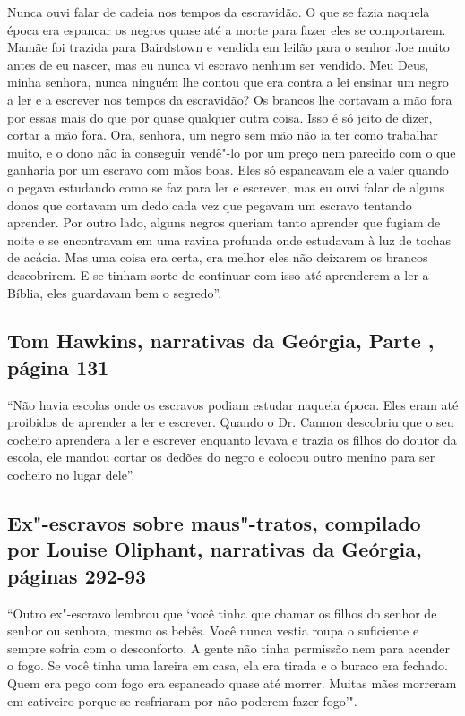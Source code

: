 Nunca ouvi falar de cadeia nos tempos da escravidão. O que se fazia
naquela época era espancar os negros quase até a morte para fazer eles
se comportarem. Mamãe foi trazida para Bairdstown e vendida em leilão
para o senhor Joe muito antes de eu nascer, mas eu nunca vi escravo
nenhum ser vendido. Meu Deus, minha senhora, nunca ninguém lhe contou
que era contra a lei ensinar um negro a ler e a escrever nos tempos da
escravidão? Os brancos lhe cortavam a mão fora por essas mais do que por
quase qualquer outra coisa. Isso é só jeito de dizer, cortar a mão fora.
Ora, senhora, um negro sem mão não ia ter como trabalhar muito, e o dono
não ia conseguir vendê"-lo por um preço nem parecido com o que ganharia
por um escravo com mãos boas. Eles só espancavam ele a valer quando o
pegava estudando como se faz para ler e escrever, mas eu ouvi falar de
alguns donos que cortavam um dedo cada vez que pegavam um escravo
tentando aprender. Por outro lado, alguns negros queriam tanto aprender
que fugiam de noite e se encontravam em uma ravina profunda onde
estudavam à luz de tochas de acácia. Mas uma coisa era certa, era melhor
eles não deixarem os brancos descobrirem. E se tinham sorte de continuar
com isso até aprenderem a ler a Bíblia, eles guardavam bem o segredo''.

\subsection{Tom Hawkins, narrativas da Geórgia, Parte , página 131}
\label{ref126}

``Não havia escolas onde os escravos podiam estudar naquela época. Eles
eram até proibidos de aprender a ler e escrever. Quando o Dr. Cannon
descobriu que o seu cocheiro aprendera a ler e escrever enquanto levava
e trazia os filhos do doutor da escola, ele mandou cortar os dedões do
negro e colocou outro menino para ser cocheiro no lugar dele''.

\subsection{Ex"-escravos sobre maus"-tratos, compilado por Louise Oliphant, narrativas
da Geórgia, páginas 292-93} %

``Outro ex"-escravo lembrou que `você tinha que chamar os filhos do
senhor de senhor ou senhora, mesmo os bebês. Você nunca vestia roupa o
suficiente e sempre sofria com o desconforto. A gente não tinha
permissão nem para acender o fogo. Se você tinha uma lareira em casa,
ela era tirada e o buraco era fechado. Quem era pego com fogo era
espancado quase até morrer. Muitas mães morreram em cativeiro porque se
resfriaram por não poderem fazer fogo'".

